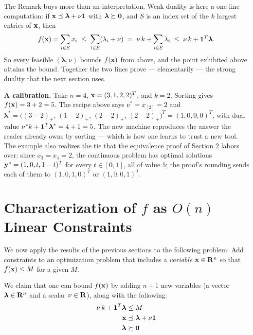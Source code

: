 \documentclass[12pt]{article}
\begin{document}
The Remark buys more than an interpretation.  Weak duality is here a
one-line computation: if ${\bf x} \preceq {\boldsymbol \lambda} + \nu {\bf 1}$
with ${\boldsymbol \lambda} \succeq {\bf 0}$, and $S$ is an index set of
the $k$ largest entries of ${\bf x}$, then
\begin{align*}
	f({\bf x}) = \sum_{i \in S} x_i
	\;\le\; \sum_{i \in S} (\lambda_i + \nu)
	\;=\; \nu \, k + \sum_{i \in S} \lambda_i
	\;\le\; \nu \, k + {\bf 1}^T {\boldsymbol \lambda}.
\end{align*}
So every feasible $({\boldsymbol \lambda}, \nu)$ bounds $f({\bf x})$ from
above, and the point exhibited above attains the bound.  Together the two
lines prove --- elementarily --- the strong duality that the next section
uses.

\textbf{A calibration.} Take $n = 4$, ${\bf x} = (3, 1, 2, 2)^T$, and
$k = 2$.  Sorting gives $f({\bf x}) = 3 + 2 = 5$.  The recipe above says
$\nu^* = x_{[2]} = 2$ and
${\boldsymbol \lambda}^* = \bigl((3-2)_+,\, (1-2)_+,\, (2-2)_+,\, (2-2)_+\bigr)^T
= (1, 0, 0, 0)^T$,
with dual value $\nu^* k + {\bf 1}^T {\boldsymbol \lambda}^* = 4 + 1 = 5$.
The new machine reproduces the answer the reader already owns by sorting
--- which is how one learns to trust a new tool.  The example also
realizes the tie that the equivalence proof of Section 2 labors over:
since $x_3 = x_4 = 2$, the continuous problem has optimal solutions
${\bf y}^* = (1, 0, t, 1-t)^T$ for every $t \in [0, 1]$, all of value
$5$; the proof's rounding sends each of them to $(1,0,1,0)^T$ or
$(1,0,0,1)^T$.

\section{Characterization of $f$ as $O(n)$ Linear Constraints}
We now apply the results of the previous sections to the following problem:
Add constraints to an optimization problem that includes a {\it variable} ${\bf x} \in {\bf R}^n$
so that $f({\bf x}) \le M$ for a given $M$.

We claim that one can bound $f({\bf x})$ by adding $n+1$ new variables
(a vector ${\boldsymbol \lambda} \in {\bf R}^n$ and a scalar $\nu \in {\bf R}$),
along with the following:
\begin{align}
	\nu \, k + {\bf 1}^T {\boldsymbol \lambda} &\le M \label{opp1} \\
	{\bf x} &\preceq {\boldsymbol \lambda} + \nu {\bf 1} \label{opp2} \\
	{\boldsymbol \lambda} &\succeq {\bf 0} \label{opp3}
\end{align}
\end{document}
